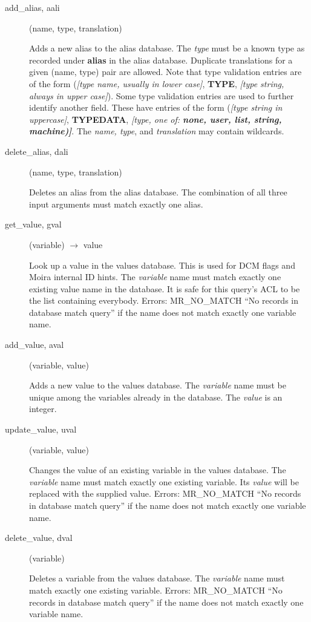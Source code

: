 \documentclass{article}
\begin{document}
\begin{description}
\item[add\_alias, aali](name, type, translation)

Adds a new alias to the alias database.  The {\em type} must be a known
type as recorded under {\bf alias} in the alias database.  Duplicate
translations for a given (name, type) pair are allowed.  Note that
type validation entries are of the form ({\em [type name, usually in
lower case]}, {\bf TYPE}, {\em [type string, always in upper case]}).
Some type validation entries are used to further identify another
field.  These have entries of the form ({\em [type string in
uppercase]}, {\bf TYPEDATA}, {\em [type, one of: {\bf none, user, list,
string, machine)]}}.  The {\em name, type}, and {\em translation} may
contain wildcards.

\item[delete\_alias, dali](name, type, translation)

Deletes an alias from the alias database.  The combination of all
three input arguments must match exactly one alias.

\item[get\_value, gval](variable) $\rightarrow$ value

Look up a value in the values database.  This is used for DCM flags
and Moira internal ID hints.  The {\em variable} name must match exactly
one existing value name in the database.  It is safe for this query's
ACL to be the list containing everybody.  Errors: MR\_NO\_MATCH ``No
records in database match query'' if the name does not match exactly
one variable name.

\item[add\_value, aval](variable, value)

Adds a new value to the values database.  The {\em variable} name must
be unique among the variables already in the database.  The {\em value}
is an integer.

\item[update\_value, uval](variable, value)

Changes the value of an existing variable in the values database.  The
{\em variable} name must match exactly one existing variable.  Its
{\em value} will be replaced with the supplied value.  Errors:
MR\_NO\_MATCH ``No records in database match query'' if the name does not
match exactly one variable name.

\item[delete\_value, dval](variable)

Deletes a variable from the values database.  The {\em variable} name
must match exactly one existing variable.  Errors: MR\_NO\_MATCH ``No
records in database match query'' if the name does not match exactly
one variable name.


\end{description}
\end{document}
